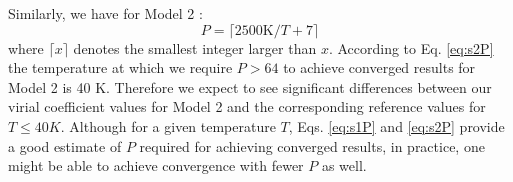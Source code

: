             Similarly, we have for Model 2 \cite{Garberoglio2012}:
            \begin{equation}
            \label{eq:s2P}
                P = \lceil 2500 \textrm{K}/T + 7 \rceil
            \end{equation}
            where $\lceil x \rceil$ denotes the smallest integer larger than $x$.
According to Eq. \eqref{eq:s2P} the temperature at which we require $P > 64$ to achieve converged results for Model 2 is 40 K. Therefore we expect to see significant differences between our virial coefficient values for Model 2 and the corresponding reference values for $T \le 40 K$. Although for a given temperature $T$, Eqs. \eqref{eq:s1P} and \eqref{eq:s2P} provide a good estimate of $P$ required for achieving converged results, in practice, one might be able to achieve convergence with fewer $P$ as well.

